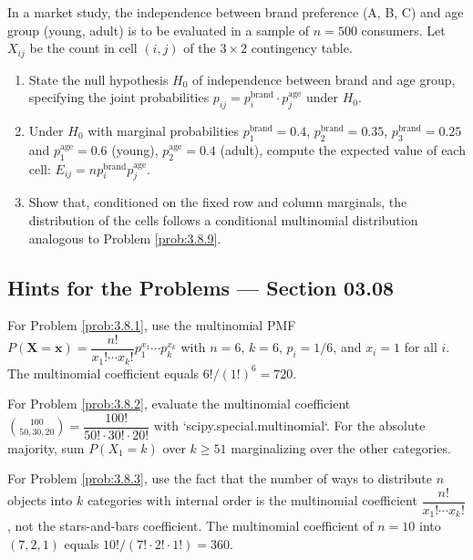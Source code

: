 \begin{problema}
	\label{prob:3.8.10}
	In a market study, the independence between brand preference (A, B, C) and age group (young, adult) is to be evaluated in a sample of $n = 500$ consumers. Let $X_{ij}$ be the count in cell $(i, j)$ of the $3 \times 2$ contingency table.
	\begin{enumerate}
		\item State the null hypothesis $H_{0}$ of independence between brand and age group, specifying the joint probabilities $p_{ij} = p_{i}^{\text{brand}} \cdot p_{j}^{\text{age}}$ under $H_{0}$.
		\item Under $H_{0}$ with marginal probabilities $p_{1}^{\text{brand}} = 0.4$, $p_{2}^{\text{brand}} = 0.35$, $p_{3}^{\text{brand}} = 0.25$ and $p_{1}^{\text{age}} = 0.6$ (young), $p_{2}^{\text{age}} = 0.4$ (adult), compute the expected value of each cell: $E_{ij} = n p_{i}^{\text{brand}} p_{j}^{\text{age}}$.
		\item Show that, conditioned on the fixed row and column marginals, the distribution of the cells follows a conditional multinomial distribution analogous to Problem \ref{prob:3.8.9}.
	\end{enumerate}
\end{problema}

\subsection*{Hints for the Problems --- Section 03.08}

\begin{sugerencia}
	\label{sug:3.8.1}
	For Problem \ref{prob:3.8.1}, use the multinomial PMF $P(\bm{X} = \bm{x}) = \dfrac{n!}{x_{1}!\cdots x_{k}!} p_{1}^{x_{1}} \cdots p_{k}^{x_{k}}$ with $n=6$, $k=6$, $p_{i} = 1/6$, and $x_{i} = 1$ for all $i$. The multinomial coefficient equals $6!/(1!)^{6} = 720$.
\end{sugerencia}

\begin{sugerencia}
	\label{sug:3.8.2}
	For Problem \ref{prob:3.8.2}, evaluate the multinomial coefficient $\binom{100}{50, 30, 20} = \dfrac{100!}{50! \cdot 30! \cdot 20!}$ with `scipy.special.multinomial`. For the absolute majority, sum $P(X_{1} = k)$ over $k \ge 51$ marginalizing over the other categories.
\end{sugerencia}

\begin{sugerencia}
	\label{sug:3.8.3}
	For Problem \ref{prob:3.8.3}, use the fact that the number of ways to distribute $n$ objects into $k$ categories with internal order is the multinomial coefficient $\dfrac{n!}{x_{1}! \cdots x_{k}!}$, not the stars-and-bars coefficient. The multinomial coefficient of $n=10$ into $(7, 2, 1)$ equals $10!/(7! \cdot 2! \cdot 1!) = 360$.
\end{sugerencia}

